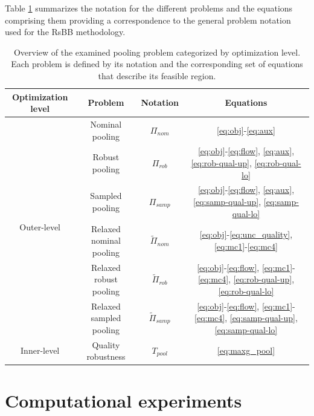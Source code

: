 \documentclass[sn-mathphys-num]{sn-jnl}
\begin{document}
 Table \ref{tab:models} summarizes the notation for the different problems and the equations comprising them providing a correspondence to the general problem notation used for the RsBB methodology.



 \begin{table}[h!]
\centering
\caption{Overview of the examined pooling problem  categorized by optimization level. Each problem is defined by its notation and the corresponding set of equations that describe its feasible region.}\label{tab:models}
\begin{tabular}{|c|c|c|c|}
\hline
\textbf{Optimization level} & \textbf{Problem} & \textbf{Notation} & \textbf{Equations} \\ \hline \hline
\multirow{6}{*}{Outer-level} 
& Nominal pooling & $\Pi_{nom}$ & \eqref{eq:obj}-\eqref{eq:aux} \\ 
& Robust pooling & $\Pi_{rob}$ & \eqref{eq:obj}-\eqref{eq:flow}, \eqref{eq:aux}, \eqref{eq:rob-qual-up}, \eqref{eq:rob-qual-lo} \\ 
& Sampled pooling & $\Pi_{samp}$ & \eqref{eq:obj}-\eqref{eq:flow}, \eqref{eq:aux}, \eqref{eq:samp-qual-up}, \eqref{eq:samp-qual-lo}\\ 
& Relaxed nominal pooling& $\tilde{\Pi}_{nom}$ & \eqref{eq:obj}-\eqref{eq:unc_quality}, \eqref{eq:mc1}-\eqref{eq:mc4} \\ 
& Relaxed robust pooling& $\tilde{\Pi}_{rob}$ & \eqref{eq:obj}-\eqref{eq:flow}, \eqref{eq:mc1}-\eqref{eq:mc4}, \eqref{eq:rob-qual-up}, \eqref{eq:rob-qual-lo} \\
& Relaxed sampled pooling& $\tilde{\Pi}_{samp}$ & \eqref{eq:obj}-\eqref{eq:flow}, \eqref{eq:mc1}-\eqref{eq:mc4}, \eqref{eq:samp-qual-up}, \eqref{eq:samp-qual-lo}\\ \hline
\multirow{1}{*}{Inner-level} 
& Quality robustness & $T_{pool}$ & \eqref{eq:maxg_pool} \\ \hline
\end{tabular}
\end{table}

\section{Computational experiments}\label{results}
\end{document}
